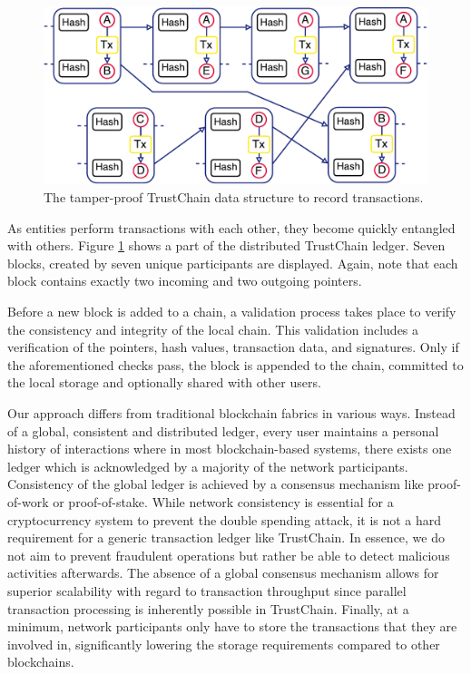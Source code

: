 \documentclass[USenglish]{article}
\begin{document}
\begin{figure}[h!]
	\centering
	\includegraphics[width=0.8\columnwidth]{assets/trustchain}
	\caption{The tamper-proof TrustChain data structure to record transactions.}
	\label{fig:trustchain}
\end{figure}

As entities perform transactions with each other, they become quickly entangled with others.
Figure \ref{fig:trustchain} shows a part of the distributed TrustChain ledger.
Seven blocks, created by seven unique participants are displayed.
Again, note that each block contains exactly two incoming and two outgoing pointers.

Before a new block is added to a chain, a validation process takes place to verify the consistency and integrity of the local chain.
This validation includes a verification of the pointers, hash values, transaction data, and signatures.
Only if the aforementioned checks pass, the block is appended to the chain, committed to the local storage and optionally shared with other users.

Our approach differs from traditional blockchain fabrics in various ways.
Instead of a global, consistent and distributed ledger, every user maintains a personal history of interactions where in most blockchain-based systems, there exists one ledger which is acknowledged by a majority of the network participants.
Consistency of the global ledger is achieved by a consensus mechanism like proof-of-work or proof-of-stake.
While network consistency is essential for a cryptocurrency system to prevent the double spending attack, it is not a hard requirement for a generic transaction ledger like TrustChain.
In essence, we do not aim to prevent fraudulent operations but rather be able to detect malicious activities afterwards.
The absence of a global consensus mechanism allows for superior scalability with regard to transaction throughput since parallel transaction processing is inherently possible in TrustChain.
Finally, at a minimum, network participants only have to store the transactions that they are involved in, significantly lowering the storage requirements compared to other blockchains.
\end{document}
